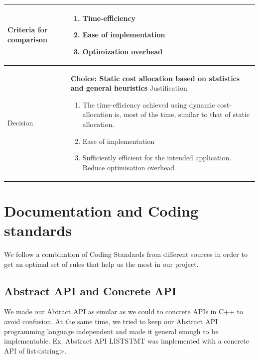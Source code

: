 \documentclass[12pt]{article}
\begin{document}
{{{{{{{{{{{{{\begin{tabular}{|L{5cm} | L{12cm}| }
 \\
\hline
    Criteria for comparison &
\begin{enumerate} \item Time-efficiency \item Ease of implementation
\item Optimization overhead \end{enumerate}
 \\
 \hline
   Decision & \textbf{Choice: Static cost allocation based on statistics and general heuristics}
   \newline Justification
\begin{enumerate}
\item The time-efficiency achieved using dynamic cost-allocation is, most of the time, similar to that of static allocation.
\item Ease of implementation
\item Sufficiently efficient for the intended application. Reduce optimisation overhead
\end{enumerate}
 \\
 \hline
\end{tabular}
\section{Documentation and Coding standards}
We follow a combination of Coding Standards from different sources in order to get an optimal set of rules that help us the most in our project.
\subsection{Abstract API and Concrete API}
We made our Abtract API as similar as we could to concrete APIs in C++ to avoid confusion. At the same time, we tried to keep our Abstract API programming language independent and made it general enough to be implementable. Ex. Abstract API LISTSTMT was implemented with a concrete API of list<string>.
}}}}}}}}}}}}}
\end{document}
